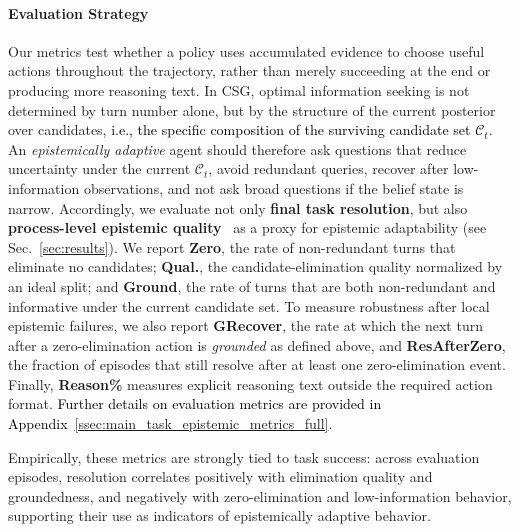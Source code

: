 \documentclass[11pt]{article}
\newcommand{\an}[1]{\textcolor{black}{#1}}
\theoremstyle{plain}
\theoremstyle{definition}
\theoremstyle{remark}
\begin{document}
\vspace*{-3mm}
\paragraph{Evaluation Strategy}
Our metrics test whether a policy uses accumulated evidence to choose useful actions throughout the trajectory, rather than merely succeeding at the end or producing more reasoning text.
In CSG, optimal information seeking is not determined by turn number alone, but by the structure of the current posterior over candidates, \an{i.e., the specific composition of the surviving candidate set $\mathcal{C}_t$}. An \textit{epistemically adaptive} agent should therefore ask questions that reduce uncertainty under the current \(\mathcal{C}_t\), avoid redundant queries, recover after low-information observations, and not ask broad questions if the belief state is narrow. Accordingly, we evaluate not only \textbf{final task resolution}, but also \textbf{process-level epistemic quality}~\citep{shao2025llm} as a proxy for epistemic adaptability (see Sec.~\ref{sec:results}). We report \textbf{Zero}, the rate of non-redundant turns that eliminate no candidates; \textbf{Qual.}, the candidate-elimination quality normalized by an ideal split; and \textbf{Ground}, the rate of turns that are both non-redundant and informative under the current candidate set. To measure robustness after local epistemic failures, we also report \textbf{GRecover}, the rate at which the next turn after a zero-elimination action is \textit{grounded} as defined above, and \textbf{ResAfterZero}, the fraction of episodes that still resolve after at least one zero-elimination event. Finally, \textbf{Reason\%} measures explicit reasoning text outside the required action format. \an{Further details on evaluation metrics are provided in Appendix~\ref{ssec:main_task_epistemic_metrics_full}.}
 
Empirically, these metrics are strongly tied to task success: across evaluation episodes, resolution correlates positively with elimination quality and groundedness, and negatively with zero-elimination and low-information behavior, supporting their use as indicators of epistemically adaptive behavior.
\end{document}
